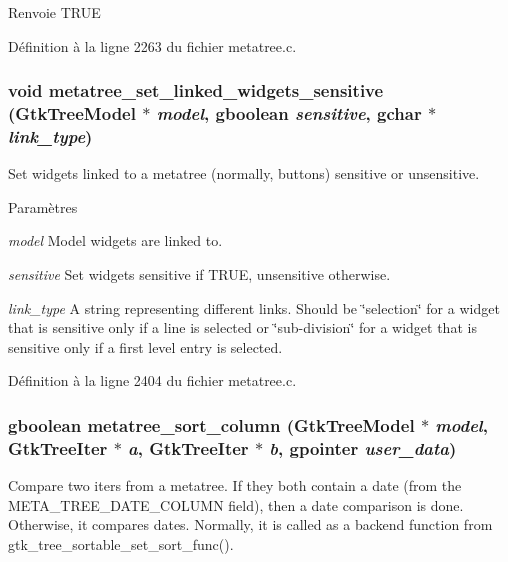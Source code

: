 \begin{DoxyReturn}{Renvoie}
TRUE 
\end{DoxyReturn}


Définition à la ligne 2263 du fichier metatree.c.

\subsubsection[{metatree\_\-set\_\-linked\_\-widgets\_\-sensitive}]{\setlength{\rightskip}{0pt plus 5cm}void metatree\_\-set\_\-linked\_\-widgets\_\-sensitive (GtkTreeModel $\ast$ {\em model}, \/  gboolean {\em sensitive}, \/  gchar $\ast$ {\em link\_\-type})}\label{metatree_8c_a5d0b0e8fc74bc89dc56d5fe7a45c22a9}
Set widgets linked to a metatree (normally, buttons) sensitive or unsensitive.


\begin{DoxyParams}{Paramètres}
\item[{\em model}]Model widgets are linked to. \item[{\em sensitive}]Set widgets sensitive if TRUE, unsensitive otherwise. \item[{\em link\_\-type}]A string representing different links. Should be \char`\"{}selection\char`\"{} for a widget that is sensitive only if a line is selected or \char`\"{}sub-\/division\char`\"{} for a widget that is sensitive only if a first level entry is selected. \end{DoxyParams}


Définition à la ligne 2404 du fichier metatree.c.

\subsubsection[{metatree\_\-sort\_\-column}]{\setlength{\rightskip}{0pt plus 5cm}gboolean metatree\_\-sort\_\-column (GtkTreeModel $\ast$ {\em model}, \/  GtkTreeIter $\ast$ {\em a}, \/  GtkTreeIter $\ast$ {\em b}, \/  gpointer {\em user\_\-data})}\label{metatree_8c_aed0f925684f06f89a0fedaf4d4a9ad11}
Compare two iters from a metatree. If they both contain a date (from the META\_\-TREE\_\-DATE\_\-COLUMN field), then a date comparison is done. Otherwise, it compares dates. Normally, it is called as a backend function from gtk\_\-tree\_\-sortable\_\-set\_\-sort\_\-func().


